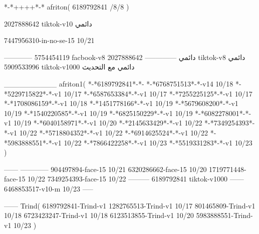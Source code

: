 *-*++++*-*
afriton(
6189792841 /8/8
)

2027888642 tiktok-v10
دائمي


7447956310-in-no-se-15 10/21

------------
5754454119 facbook-v8
دائمي
--------------
2027888642 tiktok-v8
دائمي
5909533996 tiktok-v1000
دائمي مع التحديث

__________
afriton1(
*-*6189792841*-*-
*-*6768751513*-*-v14 10/18
*-*5229715822*-*-v1 10/17
*-*6587653384*-*-v1 10/17
*-*7255225125*-*-v1 10/17
*-*1708086159*-*-v1 10/18
*-*1451778166*-*-v1 10/19
*-*5679608200*-*-v1 10/19
*-*1540220585*-*-v1 10/19
*-*6825150229*-*-v1 10/19
*-*6082278001*-*-v1 10/19
*-*6040158971*-*-v1 10/20
*-*2145633429*-*-v1 10/22
*-*7349254393*-*-v1 10/22
*-*5718804352*-*-v1 10/22
*-*6914625524*-*-v1 10/22
*-*5983888551*-*-v1 10/22
*-*7866422258*-*-v1 10/23
*-*5519331283*-*-v1 10/23
)

------
------------
904497894-face-15 10/21
6320286662-face-15 10/20
1719771448-face-15 10/22
7349254393-face-15 10/22
---------
6189792841 tiktok-v1000
------
6468853517-v10-m 10/23
-----

------
Trind(
6189792841-Trind-v1 
1282765513-Trind-v1 10/17
801465809-Trind-v1 10/18
6723423247-Trind-v1 10/18
6123513855-Trind-v1 10/20
5983888551-Trind-v1 10/23
)
